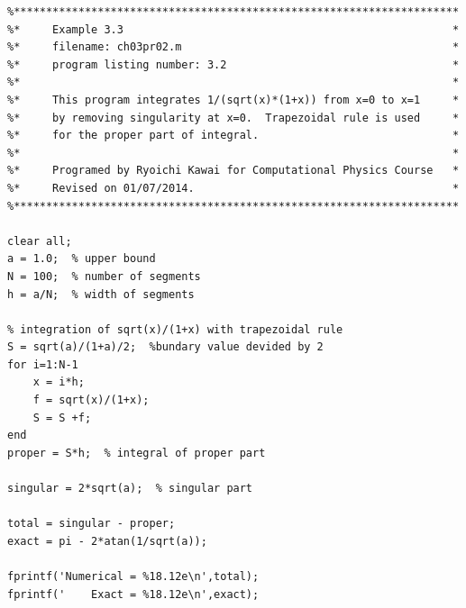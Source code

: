 
\bigskip
\noindent
\program
\label{matlab:improper_int}
\footnotesize
\begin{verbatim}
%*********************************************************************
%*     Example 3.3                                                   *
%*     filename: ch03pr02.m                                          *
%*     program listing number: 3.2                                   *
%*                                                                   *
%*     This program integrates 1/(sqrt(x)*(1+x)) from x=0 to x=1     *
%*     by removing singularity at x=0.  Trapezoidal rule is used     *
%*     for the proper part of integral.                              *
%*                                                                   *
%*     Programed by Ryoichi Kawai for Computational Physics Course   *
%*     Revised on 01/07/2014.                                        *
%*********************************************************************

clear all;
a = 1.0;  % upper bound
N = 100;  % number of segments
h = a/N;  % width of segments

% integration of sqrt(x)/(1+x) with trapezoidal rule
S = sqrt(a)/(1+a)/2;  %bundary value devided by 2
for i=1:N-1
    x = i*h;
    f = sqrt(x)/(1+x);
    S = S +f;
end
proper = S*h;  % integral of proper part

singular = 2*sqrt(a);  % singular part

total = singular - proper; 
exact = pi - 2*atan(1/sqrt(a));

fprintf('Numerical = %18.12e\n',total);
fprintf('    Exact = %18.12e\n',exact);
\end{verbatim}
\normalsize


